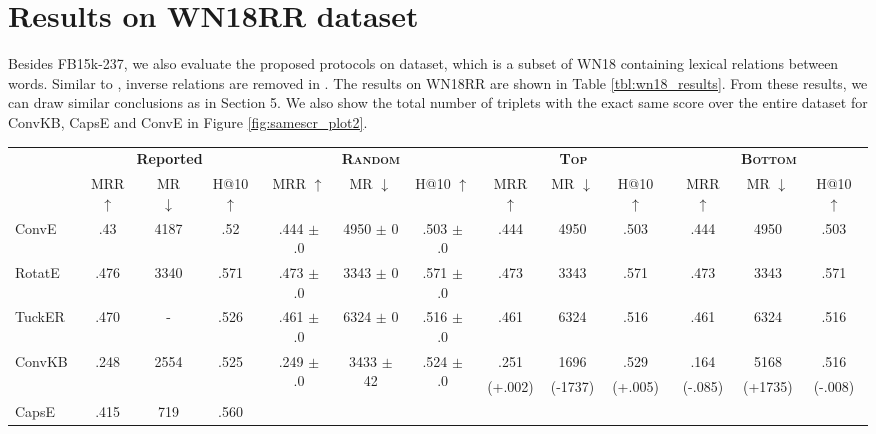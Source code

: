 \documentclass[11pt,a4paper]{article}
\begin{document}
\section{Results on WN18RR dataset}
Besides FB15k-237, we also evaluate the proposed protocols on \datawn{} \cite{conve} dataset, which is a subset of WN18 \cite{transe} containing lexical relations between words. Similar to \datafb{}, inverse relations are removed in \datawn{}. The results on WN18RR are shown in Table \ref{tbl:wn18_results}. From these results, we can draw similar conclusions as in Section 5. We also show the total number of triplets with the exact same score over the entire \datawn{} dataset for ConvKB, CapsE and ConvE in Figure \ref{fig:samescr_plot2}.

\setlength{\tabcolsep}{1.5pt}

\begin{table*}[!htb]
\small
	\centering
	\begin{tabular}{lccc|ccc|ccc|ccc}
		\toprule
		&  \multicolumn{3}{c}{\textbf{Reported}} & \multicolumn{3}{c}{\textbf{\textsc{Random}}} & \multicolumn{3}{c}{\textbf{\textsc{Top}}} & \multicolumn{3}{c}{\textbf{\textsc{Bottom}}} \\ 
		\cmidrule(r){2-4}  \cmidrule(r){5-7} \cmidrule(r){8-10} \cmidrule(r){11-13}
		& MRR $\uparrow$ & MR $\downarrow$ & H@10 $\uparrow$ & MRR  $\uparrow$ & MR $\downarrow$ & H@10 $\uparrow$ & MRR $\uparrow$ & MR $\downarrow$ & H@10 $\uparrow$ & MRR $\uparrow$ & MR $\downarrow$ & H@10 $\uparrow$ \\
		\midrule
ConvE 		& .43  & 4187 & .52  	& .444 $\pm$ .0	& 4950 $\pm$ 0	& .503 $\pm$ .0 	& .444	& 4950	& .503 	& .444	& 4950	& .503 \\
		RotatE 		& .476 &	3340 & .571 & .473 $\pm$ .0	& 3343 $\pm$ 0 & .571 $\pm$ .0 & .473 & 3343 & .571 & .473 & 3343 & .571 \\ 
		TuckER 		& .470 & -    & .526 	& .461 $\pm$ .0	 & 6324 $\pm$ 0	& .516 $\pm$ .0	& .461	 & 6324	& .516	& .461	 & 6324	& .516 \\
		\midrule
		\midrule
		\multirow{2}{*}{ConvKB} 		& \multirow{2}{*}{.248} & \multirow{2}{*}{2554} & \multirow{2}{*}{.525} 	& \multirow{2}{*}{.249 $\pm$ .0}	& \multirow{2}{*}{3433 $\pm$ 42}	&\multirow{2}{*}{.524 $\pm$ .0} & .251&	1696&	.529 & .164&	5168&	.516 \\
		& & & & & & & (+.002) & (-1737)& (+.005) & (-.085) & (+1735) & (-.008)\\
		\midrule
		\multirow{2}{*}{CapsE\ddag} 		& \multirow{2}{*}{.415} &  \multirow{2}{*}{719} & \multirow{2}{*}{.560} &

\end{tabular}
\end{table*}
\end{document}
